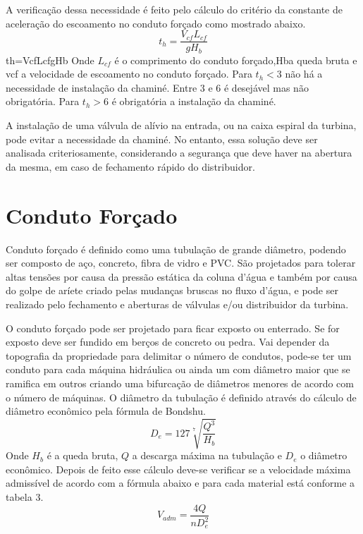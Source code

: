 A verificação dessa necessidade é feito pelo cálculo do critério da constante de aceleração do escoamento no conduto forçado como mostrado abaixo.
\begin{equation}
t_h = \dfrac{V_{cf}L_{cf}}{gH_b}
\end{equation}
th=VcfLcfgHb
Onde $L_{cf}$ é o comprimento do conduto forçado,Hba queda bruta e vcf a velocidade de escoamento no conduto forçado. Para $t_h < 3$ não há a necessidade de instalação da chaminé. Entre $3$ e $6$ é desejável mas não obrigatória. Para $t_h> 6$  é obrigatória a instalação da chaminé.

A instalação de uma válvula de alívio na entrada, ou na caixa espiral da turbina, pode evitar a necessidade da chaminé. No entanto, essa solução deve ser analisada criteriosamente, considerando a segurança que deve haver na abertura da mesma, em caso de fechamento rápido do distribuidor.

\section{Conduto Forçado}
Conduto forçado é definido como uma tubulação de grande diâmetro, podendo ser composto de aço, concreto, fibra de vidro e PVC. São projetados para tolerar altas tensões por causa da pressão estática da coluna d’água e também por causa do golpe de aríete criado pelas mudanças bruscas no fluxo d’água, e pode ser realizado pelo fechamento e aberturas de válvulas e/ou distribuidor da turbina.

O conduto forçado pode ser projetado para ficar exposto ou enterrado. Se for exposto deve ser fundido em berços de concreto ou pedra. Vai depender da topografia da propriedade para delimitar o número de condutos, pode-se ter um conduto para cada máquina hidráulica ou ainda um com diâmetro maior que se ramifica em outros criando uma bifurcação de diâmetros menores de acordo com o número de máquinas.
O diâmetro da tubulação é definido através do cálculo de diâmetro econômico pela fórmula de Bondshu.
\begin{equation}
	D_e = 127\sqrt[7]{\dfrac{Q^3}{H_b}}
\end{equation}
Onde $H_b$ é a queda bruta, $Q$ a descarga máxima na tubulação e $D_e$ o diâmetro econômico. Depois de feito esse cálculo deve-se verificar se a velocidade máxima admissível de acordo com a fórmula abaixo e para cada material está conforme a tabela 3.
\begin{equation}
	V_{adm} = \dfrac{4Q}{nD^2_e}
\end{equation}

